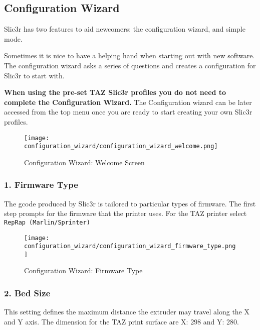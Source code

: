 
\subsection{Configuration Wizard}
\label{sec:configuration_wizard}

Slic3r has two features to aid newcomers: the configuration wizard, and simple mode.

Sometimes it is nice to have a helping hand when starting out with new software.  The configuration wizard asks a series of questions and creates a configuration for Slic3r to start with.

\textbf{When using the pre-set TAZ Slic3r profiles you do not need to complete the Configuration Wizard.} The Configuration wizard can be later accessed from the top menu once you are ready to start creating your own Slic3r profiles.

\begin{figure}[H]
\centering
\texttt{[image: configuration\_wizard/configuration\_wizard\_welcome.png]}
\caption{Configuration Wizard: Welcome Screen}
\label{fig:configuration_wizard_welcome_screen}
\end{figure}

\newpage
\subsubsection{1. Firmware Type}
\label{sub:1_firmware_type}
The gcode produced by Slic3r is tailored to particular types of firmware.  The first step prompts for the firmware that the printer uses.  For the TAZ printer select \texttt{RepRap (Marlin/Sprinter)}
\begin{figure}[H]
\centering
\texttt{[image: configuration\_wizard/configuration\_wizard\_firmware\_type.png]}
\caption{Configuration Wizard: Firmware Type}
\label{fig:configuration_wizard_firmware_type}
\end{figure}

\newpage
\subsubsection{2. Bed Size}
\label{sub:2_bed_size}
This setting defines the maximum distance the extruder may travel along the X and Y axis.  The dimension for the TAZ print surface are X: 298 and Y: 280.


